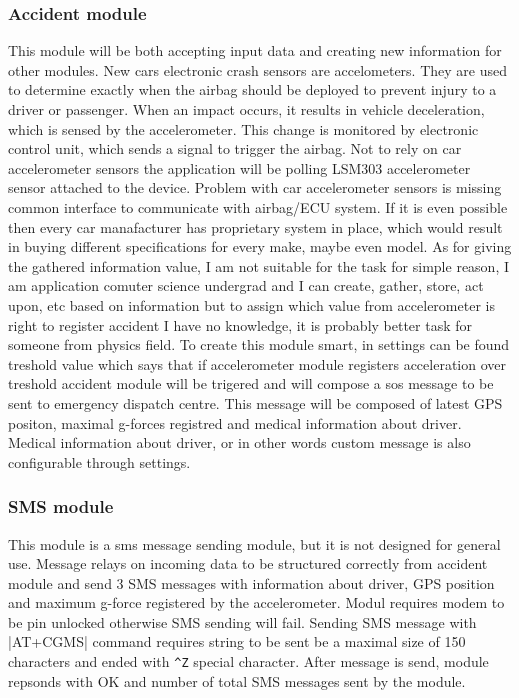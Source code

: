 \subsubsection{Accident module} %
\label{ssub:accident_module}
This module will be both accepting input data and creating new information for other modules. New cars electronic crash sensors are accelometers. They are used to determine exactly when the airbag should be deployed to prevent injury to a driver or passenger.   When an impact occurs, it results in vehicle deceleration, which is sensed by the accelerometer. This change is monitored by electronic control unit, which sends a signal to trigger the airbag. Not to rely on car accelerometer sensors the application will be polling LSM303 accelerometer sensor attached to the device. Problem with car accelerometer sensors is missing common interface to communicate with airbag/ECU system. If it is even possible then every car manafacturer has proprietary system in place, which would result in buying different specifications for every make, maybe even model. As for giving the gathered information value, I am not suitable for the task for simple reason, I am application comuter science undergrad and I can create, gather, store, act upon, etc based on information but to assign which value from accelerometer is right to register accident I have no knowledge, it is probably better task for someone from physics field. To create this module smart, in settings can be found treshold value which says that if accelerometer module registers acceleration over treshold accident module will be trigered and will compose a sos message to be sent to emergency dispatch centre. This message will be composed of latest GPS positon, maximal g-forces registred and medical information about driver. Medical information about driver, or in other words custom message is also configurable through settings.
\subsubsection{SMS module} %
\label{ssub:sms_module}
This module is a sms message sending module, but it is not designed for general use. Message relays on incoming data to be structured correctly from accident module and send 3 SMS messages with information about driver, GPS position and maximum g-force registered by the accelerometer. Modul requires modem to be pin unlocked otherwise SMS sending will fail. Sending SMS message with \verbn|AT+CGMS| command requires string to be sent be a maximal size of 150 characters and ended with \verb|^Z| special character. After message is send, module repsonds with OK and number of total SMS messages sent by the module.
